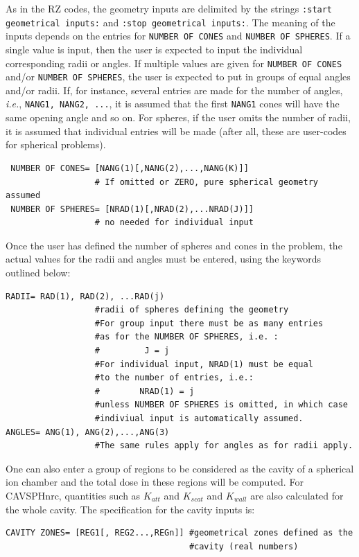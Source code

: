 \documentclass[12pt,twoside]{article}  %
\newcommand{\ie}{{\em i.e.}}
\begin{document}
As in the RZ codes, the geometry inputs are delimited by the strings
{\tt :start geometrical inputs:} and {\tt:stop geometrical inputs:}. The
meaning of the inputs depends on the entries for {\tt NUMBER OF CONES}  and
{\tt NUMBER OF SPHERES}. If a single value is input, then the user is
expected to input the individual corresponding radii or angles. If multiple
values are given for {\tt NUMBER OF CONES}  and/or {\tt NUMBER OF SPHERES},
the user is expected to put in groups of equal angles and/or radii.
If, for instance, several
entries are made for the number of angles, \ie, {\tt NANG1, NANG2, ...}, it
is assumed that the first {\tt NANG1} cones will have the same opening angle
and so on. For spheres, if the user omits the number of radii, it is
assumed that individual entries will be made (after all,
these are user-codes for spherical problems).

\begin{verbatim}
 NUMBER OF CONES= [NANG(1)[,NANG(2),...,NANG(K)]]
                  # If omitted or ZERO, pure spherical geometry assumed
 NUMBER OF SPHERES= [NRAD(1)[,NRAD(2),...NRAD(J)]]
                  # no needed for individual input
\end{verbatim}

Once the user has defined the number of spheres and cones in the problem, the
actual values for the radii and angles must be entered, using the keywords
outlined below:

\begin{verbatim}
RADII= RAD(1), RAD(2), ...RAD(j)
                  #radii of spheres defining the geometry
                  #For group input there must be as many entries
                  #as for the NUMBER OF SPHERES, i.e. :
                  #         J = j
                  #For individual input, NRAD(1) must be equal
                  #to the number of entries, i.e.:
                  #        NRAD(1) = j
                  #unless NUMBER OF SPHERES is omitted, in which case
                  #indiviual input is automatically assumed.
ANGLES= ANG(1), ANG(2),...,ANG(3)
                  #The same rules apply for angles as for radii apply.
\end{verbatim}

One can also enter a group of regions to be considered as the cavity
of a spherical ion chamber and the total dose in these regions will
be computed. For CAVSPHnrc, quantities such as
$K_{att}$ and $K_{scat}$ and $K_{wall}$ are also calculated for the
whole cavity. The specification for the cavity inputs is:
\begin{verbatim}
CAVITY ZONES= [REG1[, REG2...,REGn]] #geometrical zones defined as the
                                     #cavity (real numbers)
\end{verbatim}
\end{document}
